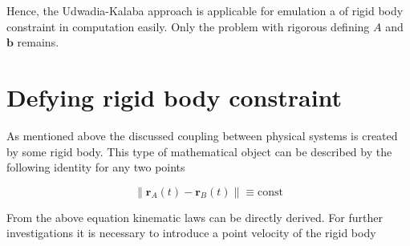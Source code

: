 Hence, the Udwadia-Kalaba approach is applicable for emulation a of 
rigid body constraint in computation easily. Only the problem with rigorous 
defining $A$ and $\mathbf{b}$ remains.

\section{Defying rigid body constraint}
\label{sec:def_rigid_body_const}

As mentioned above the discussed coupling between physical systems is created 
by some rigid body. This type of mathematical object can be described by the 
following identity for any two points

\begin{equation}
    \| \mathbf{r}_A(t) - \mathbf{r}_B(t) \| \equiv \text{const}
    \label{eqn:rigid_body_axiom}
\end{equation}

From the above equation kinematic laws can be directly derived. For further 
investigations it is necessary to introduce a point velocity of the rigid body

